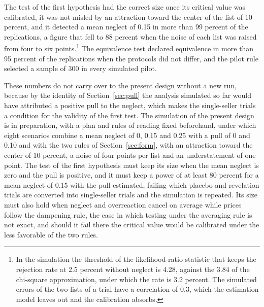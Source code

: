 \documentclass[11pt,a4paper]{article}
\begin{document}
The test of the first hypothesis had the correct size once its critical value was calibrated, it was not misled by an attraction toward the center of the list of 10 percent, and it detected a mean neglect of 0.15 in more than 99 percent of the replications, a figure that fell to 88 percent when the noise of each list was raised from four to six points.\footnote{In the simulation the threshold of the likelihood-ratio statistic that keeps the rejection rate at 2.5 percent without neglect is 4.28, against the 3.84 of the chi-square approximation, under which the rate is 3.2 percent. The simulated errors of the two lists of a trial have a correlation of 0.3, which the estimation model leaves out and the calibration absorbs.} The equivalence test declared equivalence in more than 95 percent of the replications when the protocols did not differ, and the pilot rule selected a sample of 300 in every simulated pilot.

These numbers do not carry over to the present design without a new run, because by the identity of Section~\ref{sec:pull} the analysis simulated so far would have attributed a positive pull to the neglect, which makes the single-seller trials a condition for the validity of the first test. The simulation of the present design is in preparation, with a plan and rules of reading fixed beforehand, under which eight scenarios combine a mean neglect of 0, 0.15 and 0.25 with a pull of 0 and 0.10 and with the two rules of Section~\ref{sec:form}, with an attraction toward the center of 10 percent, a noise of four points per list and an understatement of one point. The test of the first hypothesis must keep its size when the mean neglect is zero and the pull is positive, and it must keep a power of at least 80 percent for a mean neglect of 0.15 with the pull estimated, failing which placebo and revelation trials are converted into single-seller trials and the simulation is repeated. Its size must also hold when neglect and overreaction cancel on average while prices follow the dampening rule, the case in which testing under the averaging rule is not exact, and should it fail there the critical value would be calibrated under the less favorable of the two rules.
\end{document}
